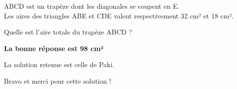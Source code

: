 
%


\begin{center}
\end{center}
\par
[Connaissances requises : à partir de la troisième]
\par

ABCD est un trapèze dont les diagonales se coupent en E.
\\
Les aires des triangles ABE et CDE valent respectivement 32 cm² et 18 cm².
\par
Quelle est l'aire totale du trapèze ABCD ?
\begin{solution}

     \textbf{La bonne réponse est 98 cm²}
\par
     La solution retenue est celle de Paki.
     \par
     Bravo et merci pour cette solution !
     \par
{}%

\end{solution}
